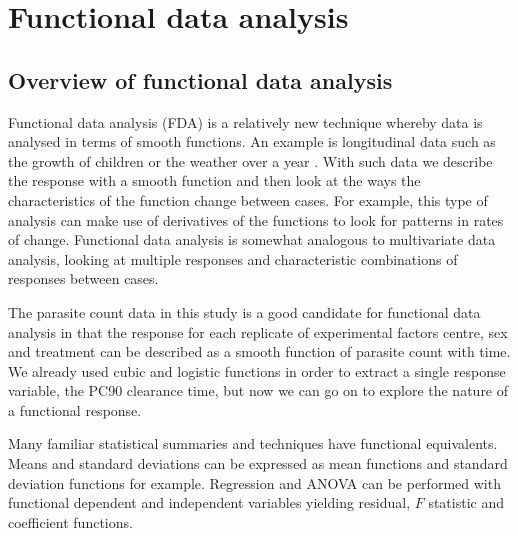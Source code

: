 

\section{Functional data analysis}
\subsection{Overview of functional data analysis}
Functional data analysis (FDA) is a relatively new technique whereby data is analysed in terms of smooth functions. An example is longitudinal data such as the growth of children or the weather over a year \cite{ramsay}. With such data we describe the response with a smooth function and then look at the ways the characteristics of the function change between cases. For example, this type of analysis can make use of derivatives of the functions to look for patterns in rates of change. Functional data analysis is somewhat analogous to multivariate data analysis, looking at multiple responses and characteristic combinations of responses between cases.

The parasite count data in this study is a good candidate for functional data analysis in that the response for each replicate of experimental factors centre, sex and treatment can be described as a smooth function of parasite count with time. We already used cubic and logistic functions in order to extract a single response variable, the PC90 clearance time, but now we can go on to explore the nature of a functional response.

Many familiar statistical summaries and techniques have functional equivalents. Means and standard deviations can be expressed as mean functions and standard deviation functions for example. Regression and ANOVA can be performed with functional dependent and independent variables yielding residual, $F$ statistic and coefficient functions.

